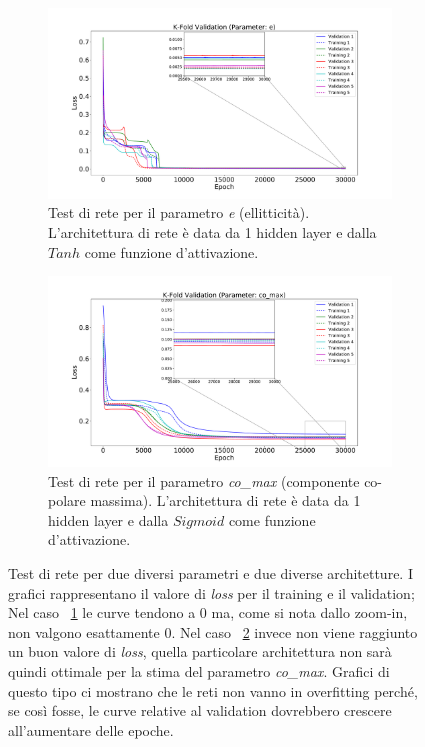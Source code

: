 \documentclass[12pt,a4paper,final]{book}
\begin{document}
\begin{figure}[!ht]
\centering
	\begin{subfigure}{\textwidth}
	    \centering
	    \includegraphics[width=0.77\linewidth]{../figures/validation_e_zoom.pdf}
	    \caption{Test di rete per il parametro \textit{e} (ellitticità). L'architettura di rete è data da 1 hidden layer e dalla $Tanh$ come funzione d'attivazione.}
	    \label{test1}
	\end{subfigure}
	\newline
	\begin{subfigure}{\textwidth}
		\centering
	    \includegraphics[width=0.77\linewidth]{../figures/validation_co_max_zoom.pdf}
		\caption{Test di rete per il parametro \textit{co\_max} (componente co-polare massima). L'architettura di rete è data da 1 hidden layer e dalla $Sigmoid$ come funzione d'attivazione.}
		\label{test2}
	\end{subfigure}
	\caption{Test di rete per due diversi parametri e due diverse architetture. I grafici rappresentano il valore di \textit{loss} per il training e il validation; Nel caso ~\ref{test1} le curve tendono a 0 ma, come si nota dallo zoom-in, non valgono esattamente 0. Nel caso ~\ref{test2} invece non viene raggiunto un buon valore di \textit{loss}, quella particolare architettura non sarà quindi ottimale per la stima del parametro \textit{co\_max}. Grafici di questo tipo ci mostrano che le reti non vanno in overfitting perché, se così fosse, le curve relative al validation dovrebbero crescere all'aumentare delle epoche.}
	\label{test_rete}
\end{figure}
\end{document}
